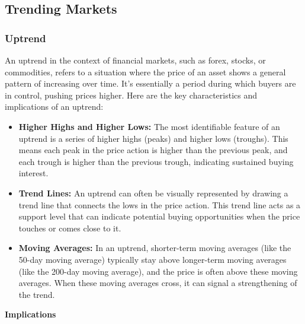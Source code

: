 \documentclass{report}
\begin{document}

    \pagebreak 
    \subsection{Trending Markets}
    \bigbreak \noindent 
    \subsubsection{Uptrend}
    \bigbreak \noindent 
    An uptrend in the context of financial markets, such as forex, stocks, or commodities, refers to a situation where the price of an asset shows a general pattern of increasing over time. It's essentially a period during which buyers are in control, pushing prices higher. Here are the key characteristics and implications of an uptrend:
    \begin{itemize}
        \item \textbf{Higher Highs and Higher Lows:} The most identifiable feature of an uptrend is a series of higher highs (peaks) and higher lows (troughs). This means each peak in the price action is higher than the previous peak, and each trough is higher than the previous trough, indicating sustained buying interest.
        \item \textbf{Trend Lines:} An uptrend can often be visually represented by drawing a trend line that connects the lows in the price action. This trend line acts as a support level that can indicate potential buying opportunities when the price touches or comes close to it.
        \item \textbf{Moving Averages:} In an uptrend, shorter-term moving averages (like the 50-day moving average) typically stay above longer-term moving averages (like the 200-day moving average), and the price is often above these moving averages. When these moving averages cross, it can signal a strengthening of the trend.
    \end{itemize}
    \bigbreak \noindent 
    \textbf{Implications}
\end{document}

